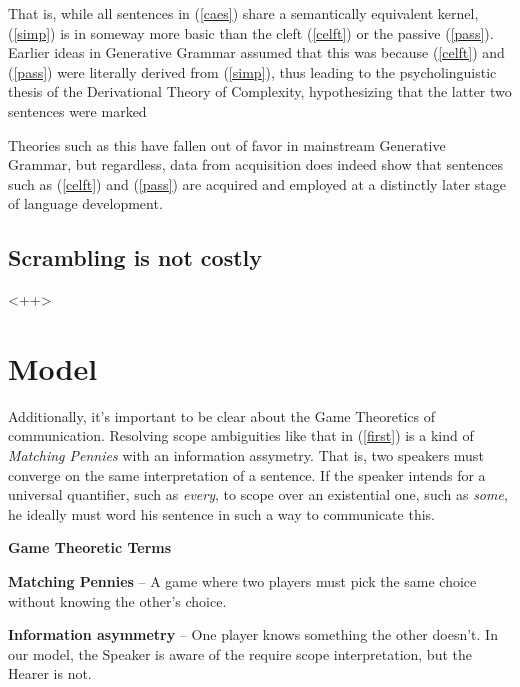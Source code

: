 \documentclass{article}
\begin{document}
That is, while all sentences in (\ref{caes}) share a semantically equivalent kernel, (\ref{simp}) is in someway more basic than the cleft (\ref{celft}) or the passive (\ref{pass}).
Earlier ideas in Generative Grammar assumed that this was because (\ref{celft}) and (\ref{pass}) were literally derived from (\ref{simp}), thus leading to the psycholinguistic thesis of the Derivational Theory of Complexity, hypothesizing that the latter two sentences were marked

Theories such as this have fallen out of favor in mainstream Generative Grammar, but regardless, data from acquisition does indeed show that sentences such as (\ref{celft}) and (\ref{pass}) are acquired and employed at a distinctly later stage of language development.


\subsection{Scrambling is not costly}

<++>

\section{Model}

Additionally, it's important to be clear about the Game Theoretics of communication.
Resolving scope ambiguities like that in (\ref{first}) is a kind of \emph{Matching Pennies} with an information assymetry.
That is, two speakers must converge on the same interpretation of a sentence.
If the speaker intends for a universal quantifier, such as \emph{every}, to scope over an existential one, such as \emph{some}, he ideally must word his sentence in such a way to communicate this.

\begin{framed}
	\small

	\textbf{Game Theoretic Terms}

	\textbf{Matching Pennies} -- A game where two players must pick the same choice without knowing the other's choice.

	\textbf{Information asymmetry} -- One player knows something the other doesn't. In our model, the Speaker is aware of the require scope interpretation, but the Hearer is not.
\end{framed}
\end{document}
